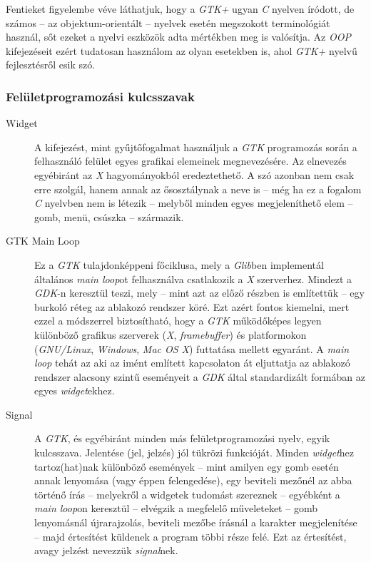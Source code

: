 Fentieket figyelembe véve láthatjuk, hogy a \textit{GTK+} ugyan \textit{C} nyelven íródott, de számos -- az objektum-orientált -- nyelvek esetén megszokott terminológiát használ, sőt ezeket a nyelvi eszközök adta mértékben meg is valósítja. Az \textit{OOP} kifejezéseit ezért tudatosan használom az olyan esetekben is, ahol \textit{GTK+} nyelvű fejlesztésről esik szó.

\subsubsection{Felületprogramozási kulcsszavak}

\begin{description}
 \item[Widget] A kifejezést, mint gyűjtőfogalmat használjuk a \textit{GTK} programozás során a felhasználó felület egyes grafikai elemeinek megnevezésére. Az elnevezés egyébiránt az \textit{X} hagyományokból eredeztethető. A szó azonban nem csak erre szolgál, hanem annak az ősosztálynak a neve is -- még ha ez a fogalom \textit{C} nyelvben nem is létezik -- melyből minden egyes megjeleníthető elem -- gomb, menü, csúszka -- származik.

 \item[GTK Main Loop] Ez a \textit{GTK} tulajdonképpeni főciklusa, mely a \textit{Glib}ben implementál általános \textit{main loop}ot felhasználva csatlakozik a \textit{X} szerverhez. Mindezt a \textit{GDK}-n keresztül teszi, mely -- mint azt az előző részben is említettük -- egy burkoló réteg az ablakozó rendszer köré. Ezt azért fontos kiemelni, mert ezzel a módszerrel biztosítható, hogy a \textit{GTK} működőképes legyen különböző grafikus szerverek (\textit{X}, \textit{framebuffer}) és platformokon (\textit{GNU/Linux}, \textit{Windows}, \textit{Mac OS X}) futtatása mellett egyaránt. A \textit{main loop} tehát az aki az imént említett kapcsolaton át eljuttatja az ablakozó rendszer alacsony szintű eseményeit a \textit{GDK} által standardizált formában az egyes \textit{widget}ekhez.

 \item[Signal] A \textit{GTK}, és egyébiránt minden más felületprogramozási nyelv, egyik kulcsszava. Jelentése (jel, jelzés) jól tükrözi funkcióját. Minden \textit{widget}hez tartoz(hat)nak különböző események -- mint amilyen egy gomb esetén annak lenyomása (vagy éppen felengedése), egy beviteli mezőnél az abba történő írás -- melyekről a widgetek tudomást szereznek -- egyébként a \textit{main loop}on keresztül -- elvégzik a megfelelő műveleteket -- gomb lenyomásnál újrarajzolás, beviteli mezőbe írásnál a karakter megjelenítése -- majd értesítést küldenek a program többi része felé. Ezt az értesítést, avagy jelzést nevezzük \textit{signal}nek.


\end{description}
